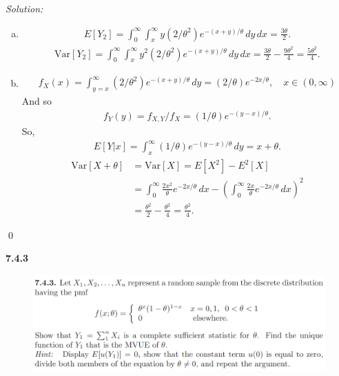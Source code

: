 \documentclass{book}
\theoremstyle{definition}
\newcommand{\Var}{\text{Var}}
\newcommand{\f}[2]{\frac{#1}{#2}}
\newcommand{\lp}{\left(}
\newcommand{\rp}{\right)}
\begin{document}
\noindent \textit{Solution:} 
\begin{enumerate}[(a)]
	\item 
	\begin{align*}
	E[Y_2] = \int^{\infty}_0 \int^{\infty}_x y(2/\theta^2)e^{-(x+y)/\theta}\,dy\,dx = \f{3\theta}{2}.
	\end{align*}
	\begin{align*}
	\Var[Y_2] = \int^{\infty}_0 \int^{\infty}_x y^2(2/\theta^2)e^{-(x+y)/\theta}\,dy\,dx = \f{3\theta}{2} - \f{9\theta^2}{4} = \f{5\theta^2}{4}.
	\end{align*}
	
	
	
	\item 
	\begin{align*}
	f_X(x) = \int^\infty_{y=x}(2/\theta^2)e^{-(x+y)/\theta}\,dy = (2/\theta)e^{-2x/\theta}, \quad x\in (0,\infty)
	\end{align*}
	And so 
	\begin{align*}
	f_Y(y) = f_{X,Y}/f_X = (1/\theta) e^{-(y-x)/\theta}.
	\end{align*}
	So,
	\begin{align*}
	E[Y\vert x] = \int^\infty_x (1/\theta) e^{-(y-x)/\theta}\,dy = x + \theta.
	\end{align*}
	\begin{align*}
	\Var[X+\theta] &= \Var[X] = E[X^2] - E^2[X]\\ 
	&= \int^\infty_0 \f{2x^2}{\theta}e^{-2x/\theta}\,dx - \lp \int^\infty_0 \f{2x}{\theta}e^{-2x/\theta}\,dx\rp^2\\
	&=  \f{\theta^2}{2} - \f{\theta^2}{4} = \f{\theta^2}{4}.
	\end{align*}
	
	
\end{enumerate}
\qed


\newpage





\noindent\textbf{7.4.3}
\begin{figure}[!htb]
	\centering
	\includegraphics[scale=1]{743}
\end{figure}
\end{document}
